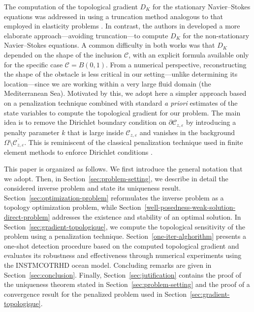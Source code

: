 \documentclass[a4paper,12pt,reqno,natbib]{amsart}
\begin{document}
The computation of the topological gradient \(D_K\) for the stationary Navier--Stokes equations was addressed in \cite{AmstutzESAIM2005} using a truncation method analogous to that employed in elasticity problems \cite{garreau2001topological}. In contrast, the authors in \cite{hassine2023topological} developed a more elaborate approach---avoiding truncation---to compute \(D_K\) for the non-stationary Navier--Stokes equations. A common difficulty in both works was that \(D_K\) depended on the shape of the inclusion \(\mathcal{C}\), with an explicit formula available only for the specific case \(\mathcal{C} = B(0,1)\). From a numerical perspective, reconstructing the shape of the obstacle is less critical in our setting---unlike determining its location---since we are working within a very large fluid domain (the Mediterranean Sea). Motivated by this, we adopt here a simpler approach based on a penalization technique combined with standard \emph{a priori} estimates of the state variables to compute the topological gradient for our problem. The main idea is to remove the Dirichlet boundary condition on \(\partial \mathcal{C}_{z,\varepsilon}\) by introducing a penalty parameter \(k\) that is large inside \(\mathcal{C}_{z,\varepsilon}\) and vanishes in the background \(\Omega \setminus \overline{\mathcal{C}_{z,\varepsilon}}\). This is reminiscent of the classical penalization technique used in finite element methods to enforce Dirichlet conditions \cite{angot1999penalization}.







This paper is organized as follows. We first introduce the general notation that we
adopt. Then, in Section~\ref{sec:problem-setting}, we describe in detail the considered inverse problem and state its uniqueness result. 
Section~\ref{sec:optimization-problem} reformulates the inverse problem as a topology optimization problem, while Section~\ref{well-posedness-weak-solution-direct-problem} addresses the existence and stability of an optimal solution. In Section~\ref{sec:gradient-topologique}, we compute the topological sensitivity of the problem using a penalization technique. Section~\ref{one-iter-alghorithm} presents a one-shot detection procedure based on the computed topological gradient and evaluates its robustness and effectiveness through numerical experiments using the \textsc{INSTMCOTRHD} ocean model. Concluding remarks are given in Section~\ref{sec:conclusion}. Finally, Section~\ref{sec:jutification} contains the proof of the uniqueness theorem stated in Section~\ref{sec:problem-setting} and the proof of a convergence result for the penalized problem used in Section~\ref{sec:gradient-topologique}.\\
\end{document}

